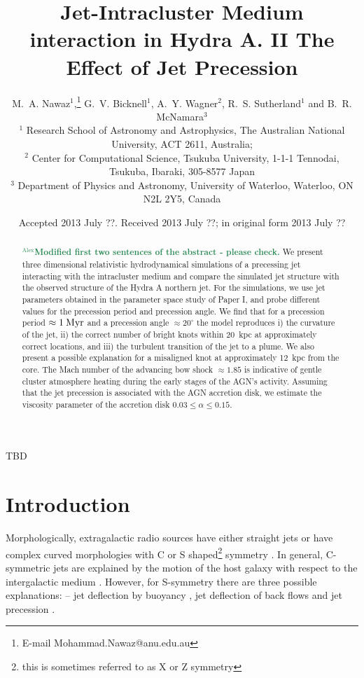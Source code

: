 \documentclass[useAMS, usenatbib]{mn2e}
\title[Jet-ICM interaction of Hydra A]{Jet-Intracluster Medium interaction in Hydra A. II The Effect of Jet Precession}
\author[M. A. Nawaz et al.]{
M.~A. Nawaz$^{1}$,\thanks{E-mail Mohammad.Nawaz@anu.edu.au} 
G.~V. Bicknell$^{1}$,
A.~Y. Wagner$^{2}$,
R.~S. Sutherland$^{1}$ 
and B.~R. McNamara$^{3}$
\\
$^{1}$ Research School of Astronomy and Astrophysics, The Australian National University, ACT 2611, Australia; \myemail \\
$^{2}$ Center for Computational Science, Tsukuba University, 1-1-1 Tennodai, Tsukuba, Ibaraki, 305-8577 Japan \\
$^{3}$ Department of Physics and Astronomy, University of Waterloo, Waterloo, ON N2L 2Y5, Canada}
\newcommand{\noteA}[1]{\textbf{\textcolor{SeaGreen}{$^\mathrm{Alex}$#1}}}
\begin{document}
\date{Accepted 2013 July ??. Received 2013 July ??; in original form 2013 July ??}

\pagerange{\pageref{firstpage}--\pageref{lastpage}} 

\maketitle

\label{firstpage}

\begin{abstract}
\noteA{Modified first two sentences of the abstract - please check.}
We present three dimensional relativistic hydrodynamical simulations of a precessing jet interacting with the intracluster medium and compare the simulated jet structure with the observed structure of the Hydra A northern jet. For the simulations, we use jet parameters obtained in the parameter space study of Paper I, and probe different values for the precession period and precession angle. We find that for a precession period $\approx 1 \> \rm Myr$ and a precession angle $\approx 20^{\circ}$ the model reproduces i) the curvature of the jet, ii) the correct number of bright knots within 20~kpc at approximately correct locations, and iii) the turbulent transition of the jet to a plume. We also present a possible explanation for a misaligned knot at approximately 12~kpc from the core. The Mach number of the advancing bow shock $\approx 1.85$ is indicative of gentle cluster atmosphere heating during the early stages of the AGN's activity. Assuming that the jet precession is associated with the AGN accretion disk, we estimate the viscosity parameter of the accretion disk $0.03\le \alpha \le 0.15$. 
\end{abstract}


\begin{keywords}
TBD
\end{keywords}


%
%
\section{Introduction}
Morphologically, extragalactic radio sources have either straight jets or have complex curved morphologies with C or S shaped\footnote{this is sometimes referred to as X or Z symmetry} symmetry \citep{zaninetti88}. In general, C-symmetric jets are explained by the motion of the host galaxy with respect to the intergalactic medium \citep{morsony13}.
However, for S-symmetry there are three possible explanations: -- jet deflection by buoyancy \citep{kraft05}, jet deflection of back flows \citep{hodges-kluck11} and jet precession \citep{kurosawa08}.
\end{document}
